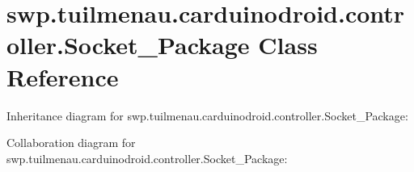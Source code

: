 \hypertarget{classswp_1_1tuilmenau_1_1carduinodroid_1_1controller_1_1_socket___package}{}\section{swp.\+tuilmenau.\+carduinodroid.\+controller.\+Socket\+\_\+\+Package Class Reference}
\label{classswp_1_1tuilmenau_1_1carduinodroid_1_1controller_1_1_socket___package}


Inheritance diagram for swp.\+tuilmenau.\+carduinodroid.\+controller.\+Socket\+\_\+\+Package\+:


Collaboration diagram for swp.\+tuilmenau.\+carduinodroid.\+controller.\+Socket\+\_\+\+Package\+:
